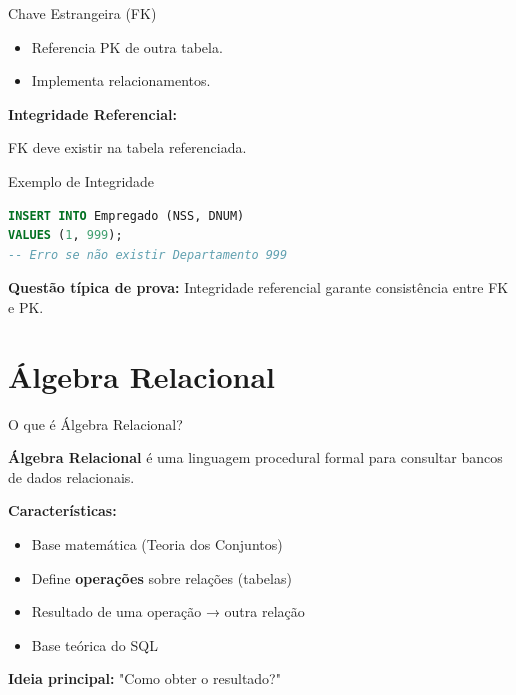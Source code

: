 \documentclass{beamer}
\begin{document}
\begin{frame}{Chave Estrangeira (FK)}

\begin{itemize}
\item Referencia PK de outra tabela.
\item Implementa relacionamentos.
\end{itemize}

\textbf{Integridade Referencial:}

FK deve existir na tabela referenciada.
\end{frame}

\begin{frame}[fragile]{Exemplo de Integridade}

\begin{lstlisting}[language=SQL]
INSERT INTO Empregado (NSS, DNUM)
VALUES (1, 999);
-- Erro se não existir Departamento 999
\end{lstlisting}

\textbf{Questão típica de prova:}
Integridade referencial garante consistência entre FK e PK.
\end{frame}


\section{Álgebra Relacional}



\begin{frame}{O que é Álgebra Relacional?}

\textbf{Álgebra Relacional} é uma linguagem procedural formal
para consultar bancos de dados relacionais.

\vspace{0.4cm}

\textbf{Características:}
\begin{itemize}
    \item Base matemática (Teoria dos Conjuntos)
    \item Define \textbf{operações} sobre relações (tabelas)
    \item Resultado de uma operação → outra relação
    \item Base teórica do SQL
\end{itemize}

\textbf{Ideia principal:}
"Como obter o resultado?"

\end{frame}
\end{document}
